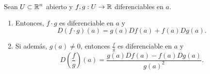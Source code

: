 \begin{colorary}
Sean $\displaystyle U \subset \mathbb{R}^{n} $ abierto y $\displaystyle f, g : U \to \mathbb{R} $ diferenciables en $\displaystyle a $. 
\begin{enumerate}
\item Entonces, $\displaystyle f \cdot g $ es diferenciable en $\displaystyle a $ y 
\[D\left(f \cdot g\right)\left(a\right) = g\left(a\right)Df\left(a\right) + f\left(a\right)Dg\left(a\right) .\]
\item Si además, $\displaystyle g\left(a\right) \neq 0 $, entonces $\displaystyle \frac{f}{g} $ es diferenciable en $\displaystyle a $ y
	\[D\left(\frac{f}{g}\right)\left(a\right) = \frac{g\left(a\right)Df\left(a\right)-f\left(a\right)Dg\left(a\right)}{g\left(a\right)^{2}} .\]
\end{enumerate}
\end{colorary}
